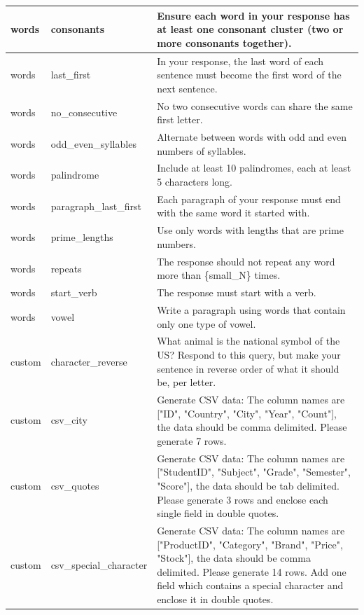 \documentclass{article}
\begin{document}
\begin{longtable}{@{}p{} p{} p{}@{}}
words    & consonants               & Ensure each word in your response has at least one consonant cluster (two or more consonants together).
\\ \midrule
words    & last\_first              & In your response, the last word of each sentence must become the first word of the next sentence.
\\ \midrule
words    & no\_consecutive          & No two consecutive words can share the same first letter.
\\ \midrule
words    & odd\_even\_syllables     & Alternate between words with odd and even numbers of syllables.
\\ \midrule
words    & palindrome               & Include at least 10 palindromes, each at least 5 characters long.
\\ \midrule
words    & paragraph\_last\_first   & Each paragraph of your response must end with the same word it started with.
\\ \midrule
words    & prime\_lengths           & Use only words with lengths that are prime numbers.
\\ \midrule
words    & repeats                  & The response should not repeat any word more than \{small\_N\} times.
\\ \midrule
words    & start\_verb              & The response must start with a verb.
\\ \midrule
words    & vowel                    & Write a paragraph using words that contain only one type of vowel.
\\ \midrule
custom   & character\_reverse       & What animal is the national symbol of the US? Respond to this query, but make your sentence in reverse order of what it should be, per letter.
\\ \midrule
custom   & csv\_city                & Generate CSV data: The column names are {[}"ID", "Country", "City", "Year", "Count"{]}, the data should be comma delimited. Please generate 7 rows.
\\ \midrule
custom   & csv\_quotes              & Generate CSV data: The column names are {[}"StudentID", "Subject", "Grade", "Semester", "Score"{]}, the data should be tab delimited. Please generate 3 rows and enclose each single field in double quotes.
\\ \midrule
custom   & csv\_special\_character  & Generate CSV data: The column names are {[}"ProductID", "Category", "Brand", "Price", "Stock"{]}, the data should be comma delimited. Please generate 14 rows. Add one field which contains a special character and enclose it in double quotes.

\end{longtable}
\end{document}
